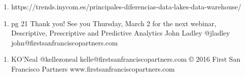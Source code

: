 \documentclass{article} %
\begin{document}
\noindent 

\begin{enumerate}
\item  https://trends.inycom.es/principales-diferencias-data-lakes-data-warehouse/
\end{enumerate}

\noindent 

\begin{enumerate}
\item  pg 21 Thank you! See you Thursday, March 2 for the next webinar, Descriptive, Prescriptive and Predictive Analytics John Ladley @jladley john@firstsanfranciscopartners.com 
\end{enumerate}

\noindent 

\begin{enumerate}
\item  KO'Neal @kellezoneal kelle@firstsanfranciscopartners.com {\copyright} 2016 First San Francisco Partners www.firstsanfranciscopartners.com
\end{enumerate}

\noindent \textbf{}

\noindent 
\end{document}
